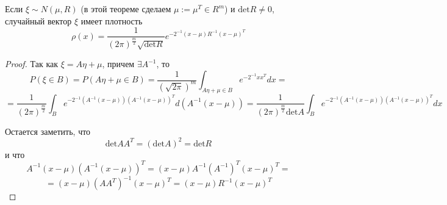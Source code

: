 \begin{theorem}
Если $\xi \sim N\left(\mu, R\right)$ (в этой теореме сделаем $\mu := \mu ^ T \in R ^ m$) и $\text{det}R \neq 0$, случайный вектор $\xi$ имеет плотность
\[
    \rho\left(x\right) = \frac1 {\left(2 \pi\right) ^ {\frac m 2} \sqrt{\text{det} R}}e ^ {-2 ^ {-1} \left(x - \mu\right) R ^ {-1} \left(x - \mu\right) ^ T}
\]
\end{theorem}

\begin{proof}
Так как $\xi = A \eta + \mu$, причем $\exists A ^ {-1}$, то
\[
    P\left(\xi \in B\right) = P\left(A \eta + \mu \in B\right) = \frac{1}{\left(\sqrt{2 \pi}\right) ^ m}
    \int_{A \eta + \mu \in B} e ^ {-2 ^ {-1}x x ^ T} dx = 
\]
\[
   =  \frac 1 {\left(2 \pi\right) ^ {\frac m 2}} \int_{B} e ^ {- 2 ^ {-1} \left(A ^ {-1}\left(x - \mu\right)\right)\left(A ^ {-1}\left(x - \mu\right)\right) ^ T} d\left(A ^ {-1} \left(x - \mu\right)\right)
   = \frac 1 {\left(2 \pi\right) ^ {\frac m 2} \text{det} A} \int_{B} e ^ {- 2 ^ {-1} \left(A ^ {-1}\left(x - \mu\right)\right)\left(A ^ {-1}\left(x - \mu\right)\right) ^ T} dx
\]

Остается заметить, что 
\[
    \text{det} A A ^ T = \left(\text{det} A\right) ^ 2 = \text{det} R
\]
и что
\[
    A ^ {-1}\left(x - \mu\right)\left(A ^ {-1}\left(x - \mu\right)\right) ^ T = 
    \left(x - \mu\right) A ^ {-1} \left(A ^ {-1}\right) ^ T \left(x - \mu\right) ^ T= 
    \]\[
    = \left(x - \mu\right) \left(A A ^ T\right) ^ {-1} \left(x - \mu\right) ^ T 
    = \left(x - \mu\right) R ^ {-1} \left(x - \mu\right) ^ T
\]

\end{proof}


